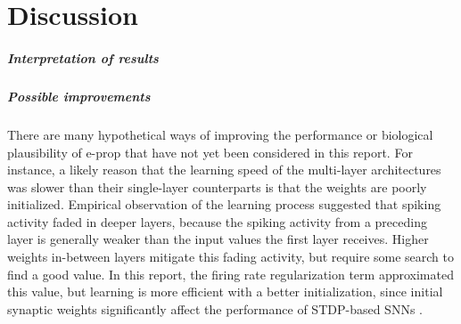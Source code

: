 \chapter{Discussion}\label{ch:discussion}

\paragraph{Interpretation of results}



\paragraph{Possible improvements}
    There are many hypothetical ways of improving the performance or biological plausibility of e-prop that have not yet been considered in this report.
    For instance, a likely reason that the learning speed of the multi-layer architectures was slower than their single-layer counterparts is that the weights are poorly initialized.
    Empirical observation of the learning process suggested that spiking activity faded in deeper layers, because the spiking activity from a preceding layer is generally weaker than the input values the first layer receives.
    Higher weights in-between layers mitigate this fading activity, but require some search to find a good value.
    In this report, the firing rate regularization term approximated this value, but learning is more efficient with a better initialization, since initial synaptic weights significantly affect the performance of STDP-based SNNs \citep{kim2020initial}.

